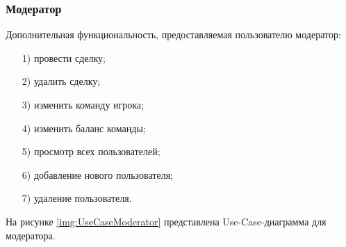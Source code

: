 \subsubsection{Модератор}
Дополнительная функциональность, предоставляемая пользователю модератор:
\begin{itemize}
	\item[1)] провести сделку;
	\item[2)] удалить сделку;
	\item[3)] изменить команду игрока;
	\item[4)] изменить баланс команды;
	\item[5)] просмотр всех пользователей;
	\item[6)] добавление нового пользователя;
	\item[7)] удаление пользователя.  
\end{itemize}
На рисунке \ref{img:UseCaseModerator} представлена Use-Case-диаграмма для модератора.
